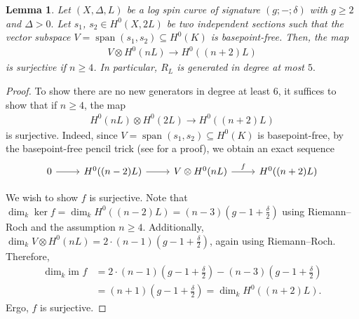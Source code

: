 \documentclass{amsart}
\theoremstyle{plain}
\newtheorem{lem}[thm]{Lemma}
\theoremstyle{definition}
\theoremstyle{remark}
\newtheorem{rem}[thm]{Remark}
\numberwithin{equation}{section}
\newcommand\im{\text{im }}
\newcommand{\halfcan}{L}
\DeclareMathOperator{\newspan}{span}
\begin{document}
\begin{lem}
\label{lem:generation-5}
Let $(X, \Delta, L)$ be a log spin curve of signature $(g; -;\delta)$
with $g \geq 2$ and $\Delta > 0.$ Let $s_1$, $s_2 \in H^0(X, 2L)$
be two independent sections such that the vector subspace $V =
\newspan(s_1, s_2) \subseteq H^0(K)$ is basepoint-free. Then, the map
\begin{align*}
	V \otimes H^0(nL) \rightarrow H^0((n+2)L)
\end{align*}
is surjective if $n \geq 4$. In particular, $R_\halfcan$ is generated in degree at most $5.$
\end{lem}


\begin{proof}
To show there are no new generators in degree at least $6$, it
suffices to show that if $n \geq 4$, the map
\begin{align*}
	H^0(nL) \otimes H^0(2L) \rightarrow H^0((n+2)L)
\end{align*}
is surjective. Indeed, since $V = \newspan(s_1, s_2) \subseteq
H^0(K)$ is basepoint-free, by the basepoint-free pencil trick (see
\cite[Lemma 2.6]{saint-donat:proj} for a proof), we obtain an exact
sequence
$$\begin{tikzcd}
0 \ar r & H^0((n-2)L) \ar r & V \otimes H^0(nL) \ar{r}{f} & H^0((n+2)L)
\end{tikzcd}$$

We wish to show $f$ is surjective.
Note that $\dim_k \ker f = \dim_k H^0((n - 2)L) = (n - 3)(g - 1+\frac{\delta}{2})$ using Riemann--Roch and the assumption $n \geq 4.$
Additionally, $\dim_k V \otimes H^0(nL) = 2 \cdot (n - 1)(g - 1+\frac{\delta}{2})$, again using Riemann--Roch.
Therefore,
\begin{align*}
	\dim_k \im f 	& = 2 \cdot (n - 1)(g - 1+ \frac{\delta}{2}) - (n - 3)(g - 1 + \frac{\delta}{2})\\
				& = (n + 1)(g - 1 + \frac{\delta}{2}) = \dim_k H^0((n + 2)L).
\end{align*}
Ergo, $f$ is surjective.
\end{proof}
\end{document}

